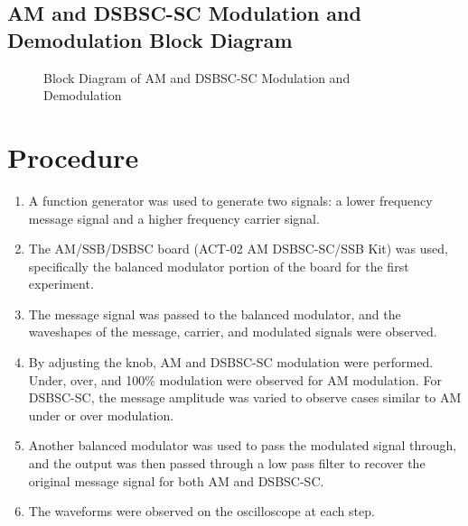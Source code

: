 \documentclass[12pt]{article}
\begin{document}
\subsection*{AM and DSB\-SC-SC Modulation and Demodulation Block Diagram}
\begin{figure}[H]
    \centering
    \caption{Block Diagram of AM and DSB\-SC-SC Modulation and Demodulation}
    \label{fig:modulation_demodulation_block_diagram}
\end{figure}

\section*{Procedure}
\begin{enumerate}
    \item A function generator was used to generate two signals: a lower frequency message signal and a higher frequency carrier signal.
    \item The AM/SSB/DSBSC board (ACT-02 AM DSB\-SC-SC/SSB Kit) was used, specifically the balanced modulator portion of the board for the first experiment.
    \item The message signal was passed to the balanced modulator, and the waveshapes of the message, carrier, and modulated signals were observed.
    \item By adjusting the knob, AM and DSB\-SC-SC modulation were performed. Under, over, and 100\% modulation were observed for AM modulation. For DSB\-SC-SC, the message amplitude was varied to observe cases similar to AM under or over modulation.
    \item Another balanced modulator was used to pass the modulated signal through, and the output was then passed through a low pass filter to recover the original message signal for both AM and DSB\-SC-SC.
    \item The waveforms were observed on the oscilloscope at each step.
\end{enumerate}
\end{document}
